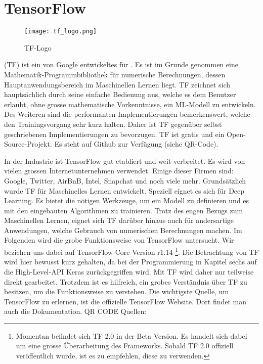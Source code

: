 \section{TensorFlow}\label{sec:tensorflow}
\begin{wrapfigure}{L}{2.5cm}
  \texttt{[image: tf\_logo.png]}
  \caption{TF-Logo}
\end{wrapfigure}
 (TF) ist ein von Google entwickeltes  für
. Es ist im Grunde genommen eine
Mathematik-Programmbibliothek für numerische Berechnungen, dessen Hauptanwendungsbereich im Maschinellen Lernen
liegt. TF zeichnet sich hauptsächlich durch seine einfache Bedienung aus, welche
es dem Benutzer erlaubt, ohne grosse mathematische Vorkenntnisse, ein ML-Modell
zu entwickeln. Des Weiteren sind die performanten
Implementierungen bemerkenswert, welche den Trainingsvorgang sehr kurz halten.
Daher ist TF gegenüber selbst geschriebenen Implementierungen zu bevorzugen.
TF ist gratis und ein Open-Source-Projekt. Es steht auf Github zur Verfügung
(siehe QR-Code).
\begin{wrapfigure}{L}{2cm}
\end{wrapfigure}
In der Industrie ist TensorFlow gut etabliert und weit verbreitet. Es wird von
vielen grossen Internetunternehmen verwendet. Einige dieser
Firmen sind: Google, Twitter, AirBnB, Intel, Snapchat und noch viele mehr.
\para{}
Grundsätzlich wurde TF für Maschinelles Lernen entwickelt. Speziell eignet es
sich für Deep Learning. Es bietet die nötigen Werkzeuge, um ein Modell zu
definieren und es mit den eingebauten Algorithmen zu trainieren.
Trotz des engen Bezugs zum Maschinellen Lernen, eignet sich TF darüber hinaus auch für
andersartige Anwendungen, welche Gebrauch von numerischen Berechnungen machen.
\para{}
Im Folgenden wird die grobe Funktionsweise von TensorFlow untersucht. Wir
beziehen uns dabei auf TensorFlow-Core Version r1.14%
\footnote{Momentan befindet sich TF 2.0 in der Beta Version. Es handelt sich
  dabei um eine grosse Überarbeitung des Frameworks. Sobald TF 2.0 offiziell
  veröffentlich wurde, ist es zu empfehlen, diese zu verwenden.}.
Die Betrachtung von TF wird hier bewusst kurz gehalten, da bei der
Programmierung in Kapitel sechs auf die High-Level-API Keras zurückgegriffen
wird. Mit TF wird daher nur teilweise direkt gearbeitet. Trotzdem ist es hilfreich, ein
grobes Verständnis über TF zu besitzen, um die Funktionsweise zu verstehen.
\para{}
Die wichtigste Quelle, um TensorFlow zu erlernen, ist die offizielle TensorFlow
Website. Dort findet man auch die Dokumentation. QR CODE
\para{}
Quellen: \cite{book:tensorflow} \cite{net:tf_docs}


